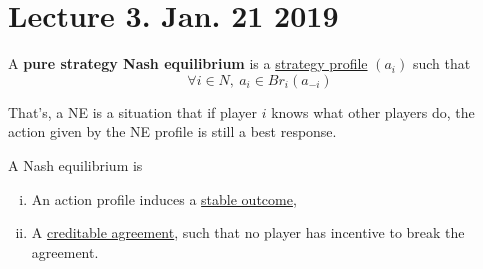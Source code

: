 \documentclass[11pt]{article}
\begin{document}
	\section{Lecture 3. Jan. 21 2019}
		\begin{definition}
			A \textbf{pure strategy Nash equilibrium} is a \ul{strategy profile} $(a_i)$ such that 
			\begin{equation}
				\forall i \in N,\ a_i \in Br_i(a_{-i})
			\end{equation}
		\end{definition}
			
		\begin{remark}
			That's, a NE is a situation that if player $i$ knows what other players do, the action given by the NE profile is still a best response.
		\end{remark}
		
		\begin{remark}[Interpretations]
			A Nash equilibrium is 
			\begin{enumerate}[i)]
				\item An action profile induces a \ul{stable outcome},
				\item A \ul{creditable agreement}, such that no player has incentive to break the agreement.
			\end{enumerate}
		\end{remark}
		
\end{document}
